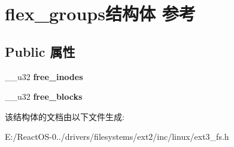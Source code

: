 \hypertarget{structflex__groups}{}\section{flex\+\_\+groups结构体 参考}
\label{structflex__groups}
\subsection*{Public 属性}
\begin{DoxyCompactItemize}
\item 
\mbox{\label{structflex__groups_a7c9e8d779bbe0102a67bd3ca1aeb2f9c}} 
\+\_\+\+\_\+u32 {\bfseries free\+\_\+inodes}
\item 
\mbox{\label{structflex__groups_ae6e152168d3079fc3af203c7527d0b08}} 
\+\_\+\+\_\+u32 {\bfseries free\+\_\+blocks}
\end{DoxyCompactItemize}


该结构体的文档由以下文件生成\+:\begin{DoxyCompactItemize}
\item 
E\+:/\+React\+O\+S-\/0../drivers/filesystems/ext2/inc/linux/ext3\+\_\+fs.\+h\end{DoxyCompactItemize}
